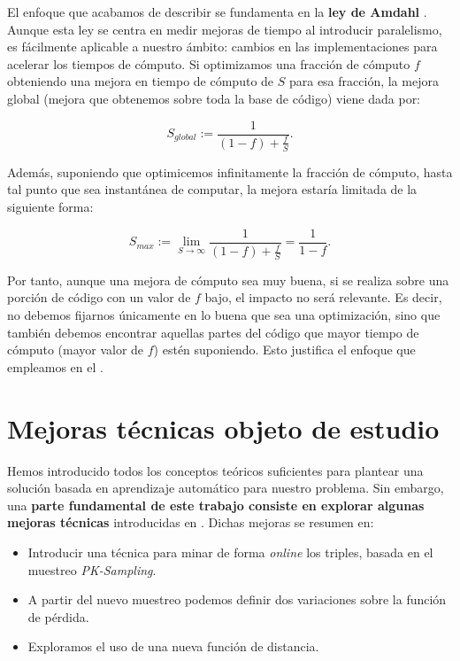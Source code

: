 El enfoque que acabamos de describir se fundamenta en la \textbf{ley de Amdahl} \cite{informatica:amdahl_original} \cite{informatica:amdahl_moderno}. Aunque esta ley se centra en medir mejoras de tiempo al introducir paralelismo, es fácilmente aplicable a nuestro ámbito: cambios en las implementaciones para acelerar los tiempos de cómputo. Si optimizamos una fracción de cómputo $f$ obteniendo una mejora en tiempo de cómputo de $S$ para esa fracción, la mejora global (mejora que obtenemos sobre toda la base de código) viene dada por:

\begin{equation} \label{eq:amdahl}
    S_{global} := \frac{1}{(1 - f) + \frac{f}{S}}.
\end{equation}

Además, suponiendo que optimicemos infinitamente la fracción de cómputo, hasta tal punto que sea instantánea de computar, la mejora estaría limitada de la siguiente forma:

\begin{equation}
    S_{max} := \lim_{S \to \infty}\frac{1}{(1 - f) + \frac{f}{S}} = \frac{1}{1 - f}.
\end{equation}

Por tanto, aunque una mejora de cómputo sea muy buena, si se realiza sobre una porción de código con un valor de $f$ bajo, el impacto no será relevante. Es decir, no debemos fijarnos únicamente en lo buena que sea una optimización, sino que también debemos encontrar aquellas partes del código que mayor tiempo de cómputo (mayor valor de $f$) estén suponiendo. Esto justifica el enfoque que empleamos en el .

\section{Mejoras técnicas objeto de estudio} \label{isec:mejoras_tecnicas_objeto_de_estudio}

Hemos introducido todos los conceptos teóricos suficientes para plantear una solución basada en aprendizaje automático para nuestro problema. Sin embargo, una \textbf{parte fundamental de este trabajo consiste en explorar algunas mejoras técnicas} introducidas en \cite{informatica:principal}. Dichas mejoras se resumen en:

\begin{itemize}
    \item Introducir una técnica para minar de forma \textit{online} los triples, basada en el muestreo \textit{PK-Sampling}.
    \item A partir del nuevo muestreo podemos definir dos variaciones sobre la función de pérdida.
    \item Exploramos el uso de una nueva función de distancia.
\end{itemize}

